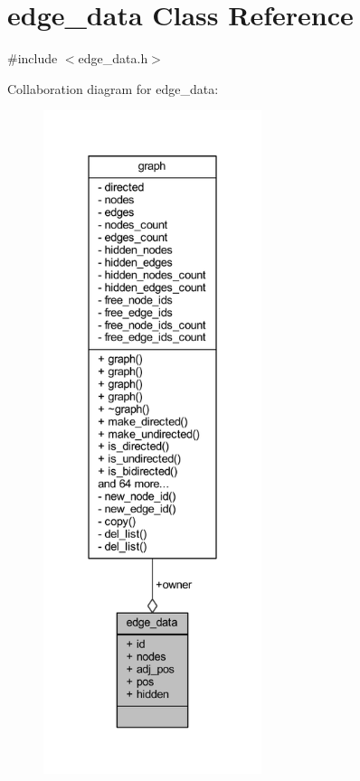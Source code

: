 \hypertarget{classedge__data}{}\section{edge\+\_\+data Class Reference}
\label{classedge__data}


{\ttfamily \#include $<$edge\+\_\+data.\+h$>$}



Collaboration diagram for edge\+\_\+data\+:\nopagebreak
\begin{figure}[H]
\begin{center}
\leavevmode
\includegraphics[height=550pt]{classedge__data__coll__graph}
\end{center}
\end{figure}
